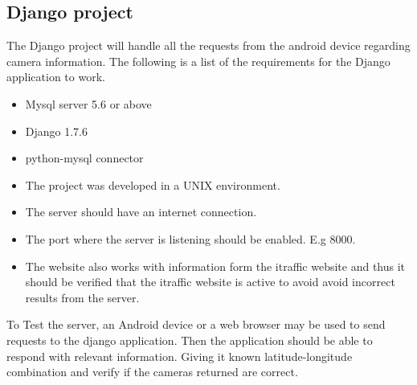 \documentclass[a4paper,12pt]{article}
\begin{document}
\subsection{Django project}
The Django project will handle all the requests from the android device regarding camera information. The following is a list of the requirements for the Django application to work.
\begin{itemize}
\item Mysql server 5.6 or above
\item Django 1.7.6
\item python-mysql connector
\item The project was developed in a UNIX environment.
\item The server should have an internet connection.
\item The port where the server is listening should be enabled. E.g 8000.
\item The website also works with information form the itraffic website and thus it should be verified that the itraffic website is active to avoid avoid incorrect results from the server.
\end{itemize}
To Test the server, an Android device or a web browser may be used to send requests to the django application. Then the application should be able to respond with relevant information. Giving it known latitude-longitude combination and verify if the cameras returned are correct.
\end{document}
